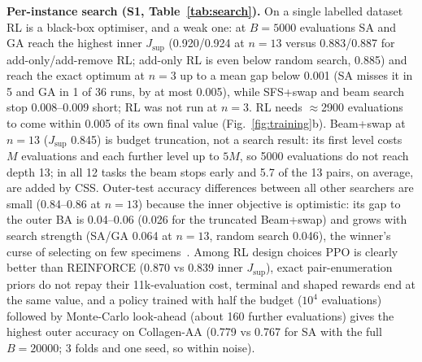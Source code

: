 \documentclass[conference]{IEEEtran}
\newcommand{\JS}{J_{\mathrm{sup}}}
\begin{document}
\begin{table}[t]
\centering
\caption{Search at a matched budget (S1, $B=5000$, mean over the 4 datasets of the repeat-0 folds and seeds) and ablations (Collagen-AA, $n=8$, $B=20000$, oracle cost charged). $\JS$ is the inner objective; kNN BA is on held-out specimens. $^{\dagger}$Budget truncation (see text), not a search result. $^{\ddagger}$Policy trained per instance with $10^4$ evaluations, then look-ahead with the rest (10\,158 evaluations in total on average, half the budget of the other rows).}
\label{tab:search}
\resizebox{\columnwidth}{!}{}
\end{table}

\textbf{Per-instance search (S1, Table~\ref{tab:search}).} On a single labelled dataset RL is a black-box optimiser, and a weak one: at $B=5000$ evaluations SA and GA reach the highest inner $\JS$ (0.920/0.924 at $n=13$ versus 0.883/0.887 for add-only/add-remove RL; add-only RL is even below random search, 0.885) and reach the exact optimum at $n=3$ up to a mean gap below 0.001 (SA misses it in 5 and GA in 1 of 36 runs, by at most 0.005), while SFS+swap and beam search stop 0.008--0.009 short; RL was not run at $n=3$. RL needs $\approx$2900 evaluations to come within 0.005 of its own final value (Fig.~\ref{fig:training}b). Beam+swap at $n=13$ ($\JS$ 0.845) is budget truncation, not a search result: its first level costs $M$ evaluations and each further level up to $5M$, so 5000 evaluations do not reach depth 13; in all 12 tasks the beam stops early and 5.7 of the 13 pairs, on average, are added by CSS. Outer-test accuracy differences between all other searchers are small (0.84--0.86 at $n=13$) because the inner objective is optimistic: its gap to the outer BA is 0.04--0.06 (0.026 for the truncated Beam+swap) and grows with search strength (SA/GA 0.064 at $n=13$, random search 0.046), the winner's curse of selecting on few specimens~\cite{varma2006bias}. Among RL design choices PPO is clearly better than REINFORCE (0.870 vs 0.839 inner $\JS$), exact pair-enumeration priors do not repay their 11k-evaluation cost, terminal and shaped rewards end at the same value, and a policy trained with half the budget ($10^4$ evaluations) followed by Monte-Carlo look-ahead (about 160 further evaluations) gives the highest outer accuracy on Collagen-AA (0.779 vs 0.767 for SA with the full $B=20000$; 3 folds and one seed, so within noise).
\end{document}
